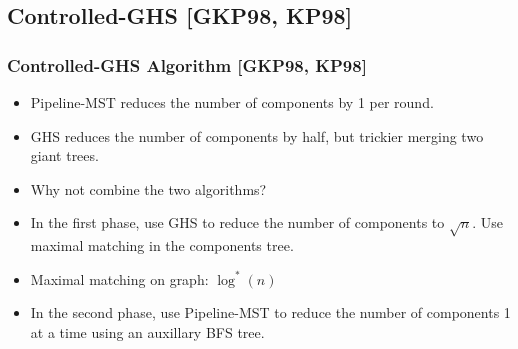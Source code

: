 
\subsection{Controlled-GHS [GKP98, KP98]}
\begin{frame}
\frametitle{Controlled-GHS Algorithm [GKP98, KP98]}
\begin{itemize}
    \item Pipeline-MST reduces the number of components by 1 per round.
    \item GHS reduces the number of components by half, but trickier merging two giant trees.
    \item Why not combine the two algorithms?
    \item In the first phase, use GHS to reduce the number of components to $\sqrt{n}$. Use maximal matching in the components tree.
    \item Maximal matching on graph: $\log^*(n)$
    \item In the second phase, use Pipeline-MST to reduce the number of components 1 at a time 
    using an auxillary BFS tree.
\end{itemize}
\end{frame}

